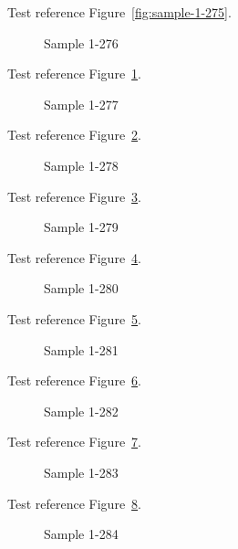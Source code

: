 Test reference Figure~\ref{fig:sample-1-275}.

\begin{figure}[tbhp]
\caption{Sample 1-276}
\label{fig:sample-1-276}
\end{figure}

Test reference Figure~\ref{fig:sample-1-276}.

\begin{figure}[tbhp]
\caption{Sample 1-277}
\label{fig:sample-1-277}
\end{figure}

Test reference Figure~\ref{fig:sample-1-277}.

\begin{figure}[tbhp]
\caption{Sample 1-278}
\label{fig:sample-1-278}
\end{figure}

Test reference Figure~\ref{fig:sample-1-278}.

\begin{figure}[tbhp]
\caption{Sample 1-279}
\label{fig:sample-1-279}
\end{figure}

Test reference Figure~\ref{fig:sample-1-279}.

\begin{figure}[tbhp]
\caption{Sample 1-280}
\label{fig:sample-1-280}
\end{figure}

Test reference Figure~\ref{fig:sample-1-280}.

\begin{figure}[tbhp]
\caption{Sample 1-281}
\label{fig:sample-1-281}
\end{figure}

Test reference Figure~\ref{fig:sample-1-281}.

\begin{figure}[tbhp]
\caption{Sample 1-282}
\label{fig:sample-1-282}
\end{figure}

Test reference Figure~\ref{fig:sample-1-282}.

\begin{figure}[tbhp]
\caption{Sample 1-283}
\label{fig:sample-1-283}
\end{figure}

Test reference Figure~\ref{fig:sample-1-283}.

\begin{figure}[tbhp]
\caption{Sample 1-284}
\label{fig:sample-1-284}
\end{figure}

